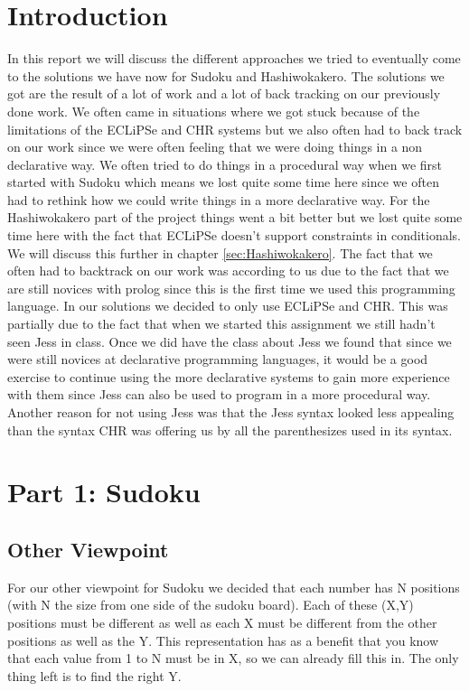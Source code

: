 \documentclass{report}
\newcommand{\mychapter}[2]{
    \setcounter{chapter}{#1}
    \setcounter{section}{0}
    \chapter*{#2}
    \addcontentsline{toc}{chapter}{#2}
}
\begin{document}
\newpage
\tableofcontents
\newpage

\mychapter{0}{Introduction}
In this report we will discuss the different approaches we tried to eventually come to the solutions we have now for Sudoku and Hashiwokakero. The solutions we got are the result of a lot of work and a lot of back tracking on our previously done work. We often came in situations where we got stuck because of the limitations of the ECLiPSe and CHR systems but we also often had to back track on our work since we were often feeling that we were doing things in a non declarative way. We often tried to do things in a procedural way when we first started with Sudoku which means we lost quite some time here since we often had to rethink how we could write things in a more declarative way. For the Hashiwokakero part of the project things went a bit better but we lost quite some time here with the fact that ECLiPSe doesn't support constraints in conditionals. We will discuss this further in chapter \ref{sec:Hashiwokakero}. The fact that we often had to backtrack on our work was according to us due to the fact that we are still novices with prolog since this is the first time we used this programming language.
	\newline
	\newline
	In our solutions we decided to only use ECLiPSe and CHR. This was partially due to the fact that when we started this assignment we still hadn't seen Jess in class. Once we did have the class about Jess we found that since we were still novices at declarative programming languages, it would be a good exercise to continue using the more declarative systems to gain more experience with them since Jess can also be used to program in a more procedural way. Another reason for not using Jess was that the Jess syntax looked less appealing than the syntax CHR was offering us by all the parenthesizes used in its syntax.
	
\mychapter{1}{Part 1: Sudoku}
\section{Other Viewpoint}
\label{sec:other_viewpoint}
For our other viewpoint for Sudoku we decided that each number has N positions (with N the size from one side of the sudoku board). Each of these (X,Y) positions must be different as well as each X must be different from the other positions as well as the Y. This representation has as a benefit that you know that each value from 1 to N must be in X, so we can already fill this in. The only thing left is to find the right Y.
\newline
\newline
\end{document}
